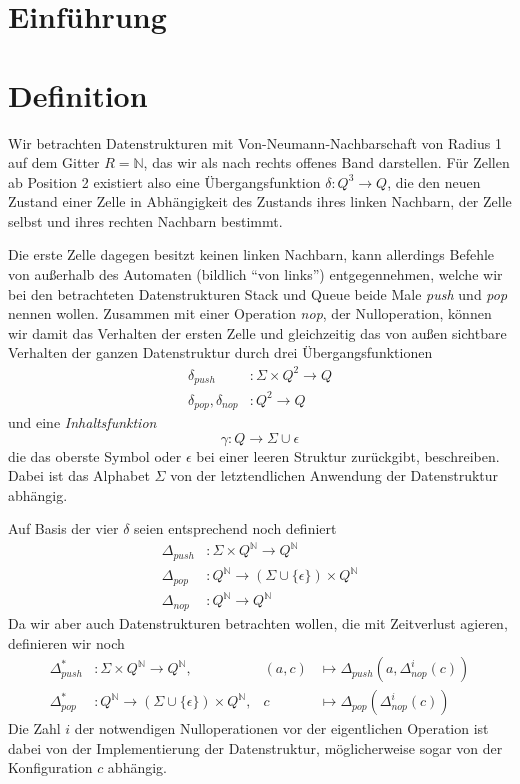 \documentclass{article}
\begin{document}
\newcommand{\ca}{\ensuremath\mathcal{A}}
\newcommand{\abs}[1]{\lvert#1\rvert}
\newcommand{\ceil}[1]{\lceil#1\rceil}
\newcommand{\zrange}[1]{\mathbb{G}_{#1}}
\newcommand{\bild}[1]{\text{Bild}(#1)}
\newcommand{\N}{\mathbb{N}}

\section{Einführung}

\section{Definition}
Wir betrachten Datenstrukturen mit Von-Neumann-Nachbarschaft von Radius 1 auf dem Gitter $R = \N$, das wir als nach rechts offenes Band darstellen. Für Zellen ab Position 2 existiert also eine Übergangsfunktion $\delta : Q^3 \rightarrow Q$, die den neuen Zustand einer Zelle in Abhängigkeit des Zustands ihres linken Nachbarn, der Zelle selbst und ihres rechten Nachbarn bestimmt.

Die erste Zelle dagegen besitzt keinen linken Nachbarn, kann allerdings Befehle von außerhalb des Automaten (bildlich "`von links"') entgegennehmen, welche wir bei den betrachteten Datenstrukturen Stack und Queue beide Male \emph{push} und \emph{pop} nennen wollen. Zusammen mit einer Operation \emph{nop}, der Nulloperation, können wir damit das Verhalten der ersten Zelle und gleichzeitig das von außen sichtbare Verhalten der ganzen Datenstruktur durch drei Übergangsfunktionen
\begin{align*}
    \delta_{push} &: \Sigma \times Q^2 \rightarrow Q \\
    \delta_{pop}, \delta_{nop} &: Q^2 \rightarrow Q
\end{align*}
und eine \emph{Inhaltsfunktion}
\[ \gamma : Q \rightarrow \Sigma \cup {\epsilon} \]
die das oberste Symbol oder $\epsilon$ bei einer leeren Struktur zurückgibt, beschreiben. Dabei ist das Alphabet $\Sigma$ von der letztendlichen Anwendung der Datenstruktur abhängig.

Auf Basis der vier $\delta$ seien entsprechend noch definiert
\begin{align*}
    \Delta_{push} &: \Sigma \times Q^\N \rightarrow Q^\N \\
    \Delta_{pop} &: Q^\N \rightarrow (\Sigma \cup \{\epsilon\}) \times Q^\N \\
    \Delta_{nop} &: Q^\N \rightarrow Q^\N
\end{align*}
Da wir aber auch Datenstrukturen betrachten wollen, die mit Zeitverlust agieren, definieren wir noch
\begin{align*}
    \Delta^*_{push} &: \Sigma \times Q^\N \rightarrow Q^\N,& (a,c) &\mapsto \Delta_{push}(a,\Delta^i_{nop}(c)) \\
    \Delta^*_{pop} &: Q^\N \rightarrow (\Sigma \cup \{\epsilon\}) \times Q^\N,& c &\mapsto \Delta_{pop}(\Delta^i_{nop}(c))
\end{align*}
Die Zahl $i$ der notwendigen Nulloperationen vor der eigentlichen Operation ist dabei von der Implementierung der Datenstruktur, möglicherweise sogar von der Konfiguration $c$ abhängig.
\end{document}
